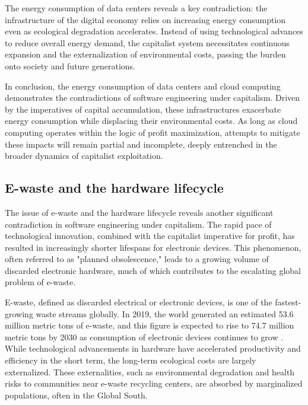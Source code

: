 \begin{refsection}
The energy consumption of data centers reveals a key contradiction: the infrastructure of the digital economy relies on increasing energy consumption even as ecological degradation accelerates. Instead of using technological advances to reduce overall energy demand, the capitalist system necessitates continuous expansion and the externalization of environmental costs, passing the burden onto society and future generations.

In conclusion, the energy consumption of data centers and cloud computing demonstrates the contradictions of software engineering under capitalism. Driven by the imperatives of capital accumulation, these infrastructures exacerbate energy consumption while displacing their environmental costs. As long as cloud computing operates within the logic of profit maximization, attempts to mitigate these impacts will remain partial and incomplete, deeply entrenched in the broader dynamics of capitalist exploitation.

\subsection{E-waste and the hardware lifecycle}

The issue of e-waste and the hardware lifecycle reveals another significant contradiction in software engineering under capitalism. The rapid pace of technological innovation, combined with the capitalist imperative for profit, has resulted in increasingly shorter lifespans for electronic devices. This phenomenon, often referred to as "planned obsolescence," leads to a growing volume of discarded electronic hardware, much of which contributes to the escalating global problem of e-waste.

E-waste, defined as discarded electrical or electronic devices, is one of the fastest-growing waste streams globally. In 2019, the world generated an estimated 53.6 million metric tons of e-waste, and this figure is expected to rise to 74.7 million metric tons by 2030 as consumption of electronic devices continues to grow \cite[pp.~4-5]{forti2020}. While technological advancements in hardware have accelerated productivity and efficiency in the short term, the long-term ecological costs are largely externalized. These externalities, such as environmental degradation and health risks to communities near e-waste recycling centers, are absorbed by marginalized populations, often in the Global South.


\end{refsection}

